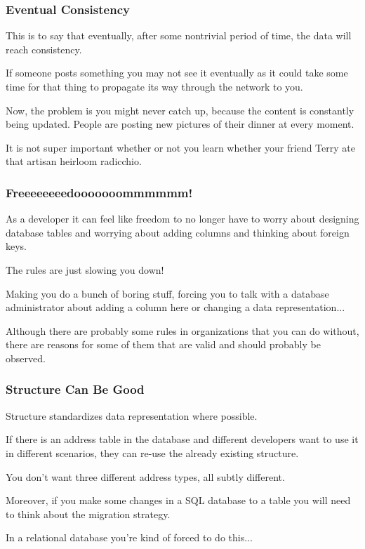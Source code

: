 \begin{frame}
\frametitle{Eventual Consistency}

This is to say that eventually, after some nontrivial period of time, the data will reach consistency. 

If someone posts something you may not see it eventually as it could take some time for that thing to propagate its way through the network to you. 

Now, the problem is you might never catch up, because the content is constantly being updated. People are posting new pictures of their dinner at every moment. 

It is not super important whether or not you learn whether your friend Terry ate that artisan heirloom radicchio.

\end{frame}



\begin{frame}
\frametitle{Freeeeeeeedooooooommmmmm!}

As a developer it can feel like freedom to no longer have to worry about designing database tables and worrying about adding columns and thinking about foreign keys. 

The rules are just slowing you down! 

Making you do a bunch of boring stuff, forcing you to talk with a database administrator about adding a column here or changing a data representation... 

Although there are probably some rules in organizations that you can do without, there are reasons for some of them that are valid and should probably be observed.

\end{frame}



\begin{frame}
\frametitle{Structure Can Be Good}

Structure standardizes data representation where possible. 

If there is an address table in the database and different developers want to use it in different scenarios, they can re-use the already existing structure.

You don't want three different address types, all subtly different.

Moreover, if you make some changes in a SQL database to a table you will need to think about the migration strategy.

In a relational database you're kind of forced to do this...

\end{frame}



